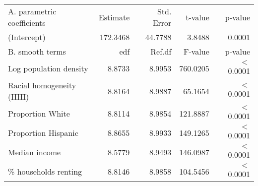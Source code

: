 \begin{table}[ht]
\centering
\begin{tabular}{lrrrr}
   \hline
A. parametric coefficients & Estimate & Std. Error & t-value & p-value \\ 
  (Intercept) & 172.3468 & 44.7788 & 3.8488 & 0.0001 \\ 
   \hline
B. smooth terms & edf & Ref.df & F-value & p-value \\ 
  Log population density & 8.8733 & 8.9953 & 760.0205 & $<$ 0.0001 \\ 
  Racial homogeneity (HHI) & 8.8164 & 8.9887 & 65.1654 & $<$ 0.0001 \\ 
  Proportion White & 8.8114 & 8.9854 & 121.8887 & $<$ 0.0001 \\ 
  Proportion Hispanic & 8.8655 & 8.9933 & 149.1265 & $<$ 0.0001 \\ 
  Median income & 8.5779 & 8.9493 & 146.0987 & $<$ 0.0001 \\ 
  \% households renting & 8.8146 & 8.9858 & 104.5456 & $<$ 0.0001 \\ 
   \hline
\end{tabular}
\caption{ } 
\label{Demographic GAM}
\end{table}
